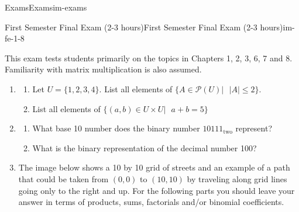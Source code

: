\documentclass[oneside,10pt,]{book}
\begin{document}
\begin{chapterptx}{Exams}{}{Exams}{}{}{im-exams}
%
%
\typeout{************************************************}
\typeout{************************************************}
%
\begin{sectionptx}{First Semester Final Exam (2-3 hours)}{}{First Semester Final Exam (2-3 hours)}{}{}{im-fe-1-8}
\begin{introduction}{}%
This exam tests students primarily on the topics in Chapters 1, 2, 3, 6, 7 and 8. Familiarity with matrix multiplication is also assumed.\end{introduction}%
\hypertarget{p-26}{}%
\leavevmode%
\begin{enumerate}
\item\hypertarget{li-1}{}%
\begin{enumerate}
\item\hypertarget{li-2}{}\hypertarget{p-27}{}%
Let \(U=\{1,2,3,4\}\). List all elements of \(\{A\in \mathcal{P}(U)|\text{ }\left| A\right| \leq 2\}\).%
\item\hypertarget{li-3}{}\hypertarget{p-28}{}%
List all elements of \(\{(a,b)\in U\times U|\text{  }a+b=5\}\)%
\end{enumerate}
%
\item\hypertarget{li-4}{}%
\begin{enumerate}
\item\hypertarget{li-5}{}\hypertarget{p-29}{}%
What base 10 number does the binary number \(10111_{\text{two}}\) represent?%
\item\hypertarget{li-6}{}\hypertarget{p-30}{}%
What is the binary representation of the decimal number 100?%
\end{enumerate}
%
\item\hypertarget{li-7}{}\hypertarget{p-31}{}%
The image below shows a 10 by 10 grid of streets and an example of a path that could be taken from \((0,0)\) to \((10,10)\) by traveling along grid lines going only to the right and up. For the following parts you should leave your answer in terms of products, sums, factorials and\slash{}or binomial coefficients.%
\begin{figure}
\centering

\end{figure}
\end{enumerate}
\end{sectionptx}
\end{chapterptx}
\end{document}
